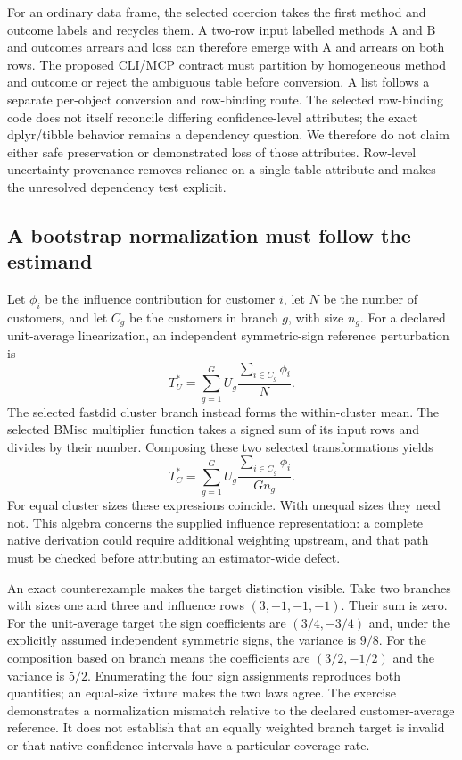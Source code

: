 For an ordinary data frame, the selected coercion takes the first method and outcome labels and recycles them. A two-row input labelled methods A and B and outcomes arrears and loss can therefore emerge with A and arrears on both rows. The proposed CLI/MCP contract must partition by homogeneous method and outcome or reject the ambiguous table before conversion. A list follows a separate per-object conversion and row-binding route. The selected row-binding code does not itself reconcile differing confidence-level attributes; the exact dplyr/tibble behavior remains a dependency question. We therefore do not claim either safe preservation or demonstrated loss of those attributes. Row-level uncertainty provenance removes reliance on a single table attribute and makes the unresolved dependency test explicit.\citep{exec29_panel_inference_sources,exec29_panel_inference_reference}

\subsection{A bootstrap normalization must follow the estimand}

Let $\phi_i$ be the influence contribution for customer $i$, let $N$ be the number of customers, and let $C_g$ be the customers in branch $g$, with size $n_g$. For a declared unit-average linearization, an independent symmetric-sign reference perturbation is
\[
 T_U^*=\sum_{g=1}^{G}U_g\frac{\sum_{i\in C_g}\phi_i}{N}.
\]
The selected fastdid cluster branch instead forms the within-cluster mean. The selected BMisc multiplier function takes a signed sum of its input rows and divides by their number. Composing these two selected transformations yields
\[
 T_C^*=\sum_{g=1}^{G}U_g\frac{\sum_{i\in C_g}\phi_i}{G n_g}.
\]
For equal cluster sizes these expressions coincide. With unequal sizes they need not. This algebra concerns the supplied influence representation: a complete native derivation could require additional weighting upstream, and that path must be checked before attributing an estimator-wide defect.\citep{exec28_panel_delegates,exec29_panel_inference_sources}

An exact counterexample makes the target distinction visible. Take two branches with sizes one and three and influence rows $(3,-1,-1,-1)$. Their sum is zero. For the unit-average target the sign coefficients are $(3/4,-3/4)$ and, under the explicitly assumed independent symmetric signs, the variance is $9/8$. For the composition based on branch means the coefficients are $(3/2,-1/2)$ and the variance is $5/2$. Enumerating the four sign assignments reproduces both quantities; an equal-size fixture makes the two laws agree. The exercise demonstrates a normalization mismatch relative to the declared customer-average reference. It does not establish that an equally weighted branch target is invalid or that native confidence intervals have a particular coverage rate.\citep{exec29_panel_inference_reference}


